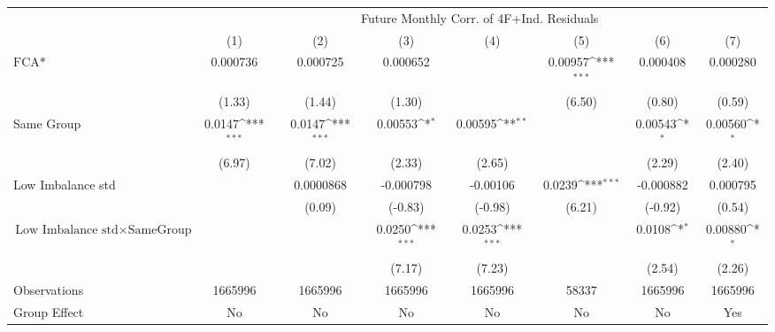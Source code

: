 {
\def\sym#1{\ifmmode^{#1}\else\(^{#1}\)\fi}
\begin{tabular}{l*{7}{c}}
\hline\hline
                &\multicolumn{7}{c}{Future Monthly Corr. of 4F+Ind. Residuals}                                                                       \\\cmidrule(lr){2-8}
                &\multicolumn{1}{c}{(1)}         &\multicolumn{1}{c}{(2)}         &\multicolumn{1}{c}{(3)}         &\multicolumn{1}{c}{(4)}         &\multicolumn{1}{c}{(5)}         &\multicolumn{1}{c}{(6)}         &\multicolumn{1}{c}{(7)}         \\
\hline
$ \text{FCA*} $ & 0.000736         & 0.000725         & 0.000652         &                  &  0.00957\sym{***}& 0.000408         & 0.000280         \\
                &   (1.33)         &   (1.44)         &   (1.30)         &                  &   (6.50)         &   (0.80)         &   (0.59)         \\
[1em]
Same Group      &   0.0147\sym{***}&   0.0147\sym{***}&  0.00553\sym{*}  &  0.00595\sym{**} &                  &  0.00543\sym{*}  &  0.00560\sym{*}  \\
                &   (6.97)         &   (7.02)         &   (2.33)         &   (2.65)         &                  &   (2.29)         &   (2.40)         \\
[1em]
Low Imbalance std&                  &0.0000868         &-0.000798         & -0.00106         &   0.0239\sym{***}&-0.000882         & 0.000795         \\
                &                  &   (0.09)         &  (-0.83)         &  (-0.98)         &   (6.21)         &  (-0.92)         &   (0.54)         \\
[1em]
 $ \text{Low Imbalance std} \times {\text{SameGroup} } $ &                  &                  &   0.0250\sym{***}&   0.0253\sym{***}&                  &   0.0108\sym{*}  &  0.00880\sym{*}  \\
                &                  &                  &   (7.17)         &   (7.23)         &                  &   (2.54)         &   (2.26)         \\
\hline
Observations    &  1665996         &  1665996         &  1665996         &  1665996         &    58337         &  1665996         &  1665996         \\
Group Effect    &       No         &       No         &       No         &       No         &       No         &       No         &      Yes         \\

\end{tabular}}

